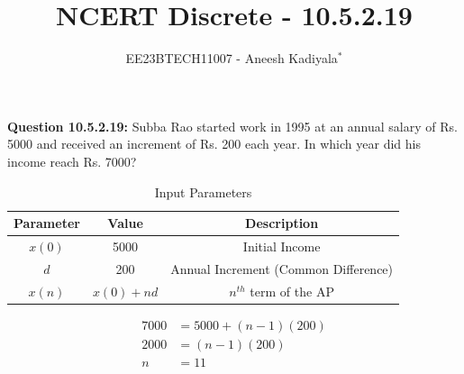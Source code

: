 \documentclass[journal,12pt,twocolumn]{IEEEtran}
\theoremstyle{remark}
\begin{document}

\vspace{3cm}

\title{NCERT Discrete - 10.5.2.19}
\author{EE23BTECH11007 - Aneesh Kadiyala$^{*}$%
}
\maketitle
\newpage
\bigskip

\renewcommand{\thefigure}{\theenumi}
\renewcommand{\thetable}{\theenumi}

\vspace{3cm}
\textbf{Question 10.5.2.19:} Subba Rao started work in 1995 at an annual salary of Rs. 5000 and received an increment of Rs. 200 each year. In which year did his income reach Rs. 7000?
\\
\solution
\begin{table}[h!]
    \centering
    \caption{Input Parameters}
    \label{tab:1}
    \begin{tabular}{ | c | c | c | }
        \hline
        Parameter & Value & Description \\
        \hline
        $x(0)$ & 5000 & Initial Income \\
        \hline
        $d$ & 200 & Annual Increment (Common Difference) \\
        \hline
        $x(n)$ & $x(0) + nd$ & $n^{th}$ term of the AP \\
        \hline
    \end{tabular}
\end{table}
\begin{align}
7000 &= 5000 + (n - 1)(200) \\
2000 &= (n - 1)(200) \\
n &= 11
\end{align}
\end{document}
